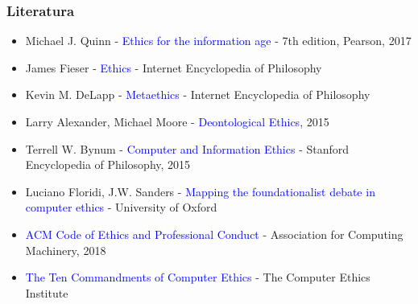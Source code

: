 \documentclass[pdf]{beamer}
\begin{document}
\begin{frame}
\frametitle{Literatura}

	\begin{itemize}	
	\item Michael J. Quinn - \textcolor{blue}{Ethics for the information age} - 7th edition, Pearson, 2017
	\item James Fieser - \textcolor{blue}{Ethics} - Internet Encyclopedia of Philosophy
	\item Kevin M. DeLapp - \textcolor{blue}{Metaethics} - Internet Encyclopedia of Philosophy
	\item Larry Alexander, Michael Moore - \textcolor{blue}{Deontological Ethics}, 2015
	\item Terrell W. Bynum - \textcolor{blue}{Computer and Information Ethics} - Stanford Encyclopedia of Philosophy, 2015
	\item Luciano Floridi, J.W. Sanders - \textcolor{blue}{Mapping the foundationalist debate in computer ethics} - University of Oxford
	\item \textcolor{blue}{ACM Code of Ethics and Professional Conduct} - Association for Computing Machinery, 2018
	\item \textcolor{blue}{The  Ten  Commandments  of  Computer  Ethics} - The  Computer  Ethics  Institute
	\end{itemize}



\end{frame}
\end{document}
